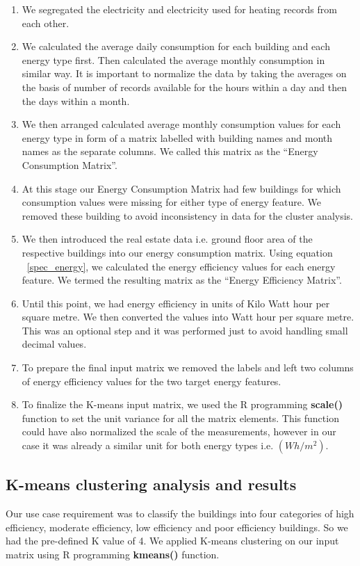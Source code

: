 \begin{enumerate}
\item We segregated the electricity and electricity used for heating records from each other.
\item We calculated the average daily consumption for each building and each energy type first. Then calculated the average monthly consumption in similar way. It is important to normalize the data by taking the averages on the basis of number of records available for the hours within a day and then the days within a month. 
\item We then arranged calculated average monthly consumption values for each energy type in form of a matrix labelled with building names and month names as the separate columns. We called this matrix as the ``Energy Consumption Matrix''.   
\item At this stage our Energy Consumption Matrix had few buildings for which consumption values were missing for either type of energy feature. We removed these building to avoid inconsistency in data for the cluster analysis. 
\item We then introduced the real estate data i.e. ground floor area of the respective buildings into our energy consumption matrix. Using equation ~\ref{spec_energy}, we calculated the energy efficiency values for each energy feature. We termed the resulting matrix as the ``Energy Efficiency Matrix''.
\item Until this point, we had energy efficiency in units of Kilo Watt hour per square metre. We then converted the values into Watt hour per square metre. This was an optional step and it was performed just to avoid handling small decimal values.
\item To prepare the final input matrix we removed the labels and left two columns of energy efficiency values for the two target energy features.
\item To finalize the K-means input matrix, we used the R programming \textbf{scale()} function to set the unit variance for all the matrix elements. This function could have also normalized the scale of the measurements, however in our case it was already a similar unit for both energy types i.e. \((Wh/m^2)\).        
\end{enumerate}
\subsection{K-means clustering analysis and results}
Our use case requirement was to classify the buildings into four categories of high efficiency, moderate efficiency, low efficiency and poor efficiency buildings. So we had the pre-defined K value of 4. We applied K-means clustering on our input matrix using R programming \textbf{kmeans()} function.

